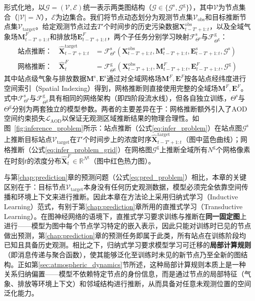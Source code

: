 形式化地，以$\mathcal{G} = (\mathcal{V}, \mathcal{E})$统一表示两类图结构（$\mathcal{G} \in \{\mathcal{G}^{\text{s}}, \mathcal{G}^{\text{g}}\}$），其中$\mathcal{V}$为节点集合（$|\mathcal{V}| = N$），$\mathcal{E}$为边集合。我们将节点动态划分为观测节点集$\mathcal{V}_{\text{obs}}$和目标推断节点集$\mathcal{V}_{\text{target}}$。给定观测节点过去$T'$个时间步的历史污染数据$\mathbf{X}^{\text{obs}}_{t-T'+1:t}$，以及全域气象场$\mathbf{M}^{F}_{t-T'+1:t}$和排放场$\mathbf{E}^{F}_{t-T'+1:t}$，两个子任务分别学习映射$\mathcal{F}^{\text{s}}_{\Theta^{\text{s}}}$与$\mathcal{F}^{\text{g}}_{\Theta^{\text{g}}}$：
\begin{align}
    \text{站点推断：} \quad \hat{\mathbf{X}}^{\text{target}}_{t-T'+1:t} &= \mathcal{F}^{\text{s}}_{\Theta^{\text{s}}}(\mathbf{X}^{\text{obs}}_{t-T'+1:t}, \mathbf{M}^{\text{s}}_{t-T'+1:t}, \mathbf{E}^{\text{s}}_{t-T'+1:t}, \mathcal{G}^{\text{s}}) \label{eq:infer_problem} \\
    \text{网格推断：} \quad \hat{\mathbf{X}}^{F}_t &= \mathcal{F}^{\text{g}}_{\Theta^{\text{g}}}(\mathbf{X}^{\text{obs}}_{t-T'+1:t}, \mathbf{M}^{F}_{t-T'+1:t}, \mathbf{E}^{F}_{t-T'+1:t}, \mathcal{G}^{\text{g}}) \label{eq:infer_problem_grid}
\end{align}
\noindent 其中站点级气象与排放数据$\mathbf{M}^{\text{s}}, \mathbf{E}^{\text{s}}$通过对全域网格场$\mathbf{M}^{F}, \mathbf{E}^{F}$按各站点经纬度进行空间索引（Spatial Indexing）得到，网格推断则直接使用完整的全域场$\mathbf{M}^{F}, \mathbf{E}^{F}$。
\noindent 式中$\mathcal{F}^{\text{s}}_{\Theta^{\text{s}}}$与$\mathcal{F}^{\text{g}}_{\Theta^{\text{g}}}$具有相同的网络架构（即四阶段流水线），但各自独立训练，$\Theta^{\text{s}}$与$\Theta^{\text{g}}$分别为两套独立的模型参数。两者的主要差异在于：网格推断额外引入了AOD空间约束损失$\mathcal{L}_{\mathrm{AOD}}$以保证无观测区域推断结果的物理合理性。如图~\ref{fig:inference_problem}所示：站点推断（公式\eqref{eq:infer_problem}）在站点图$\mathcal{G}^{\text{s}}$上推断目标站点$\mathcal{V}_{\text{target}}$在$T'$个时间步上的浓度时序$\hat{\mathbf{X}}^{\text{target}}_{t-T'+1:t}$（图中蓝色曲线）；网格推断（公式\eqref{eq:infer_problem_grid}）在网格图$\mathcal{G}^{\text{g}}$上推断全域所有$N^{\text{g}}$个网格像素在时刻$t$的浓度分布$\hat{\mathbf{X}}^{F}_t \in \mathbb{R}^{N^{\text{g}}}$（图中红色热力图）。

与第\ref{chap:prediction}章的预测问题（公式\eqref{eq:pred_problem}）相比，本章的关键区别在于：目标节点$\mathcal{V}_{\text{target}}$本身没有任何历史观测数据，模型必须完全依靠空间传播和环境上下文来进行推断。因此本章在方法论上采用归纳式学习（Inductive Learning）范式，有别于第\ref{chap:prediction}章所用的直推式学习（Transductive Learning）\citep{battaglia2018relational}。在图神经网络的语境下，直推式学习要求训练与推断在\textbf{同一固定图}上进行——模型为图中每个节点学习特定的嵌入表示，因此只能对训练时已见的节点做出预测，第\ref{chap:prediction}章的预测任务即属于此类，所有站点在训练阶段均已知且具备历史观测。相比之下，归纳式学习要求模型学习可迁移的\textbf{局部计算规则}（即消息传递与聚合函数），使其能够泛化至训练时未见的新节点乃至全新的图结构。正如第\ref{sec:atmospheric_dynamics}节所述，这种局部计算规则本质上是一种关系归纳偏置——模型不依赖特定节点的身份信息，而是通过节点的局部特征（气象、排放等环境上下文）和邻域结构进行推断，从而具备对任意未观测位置的空间泛化能力。

